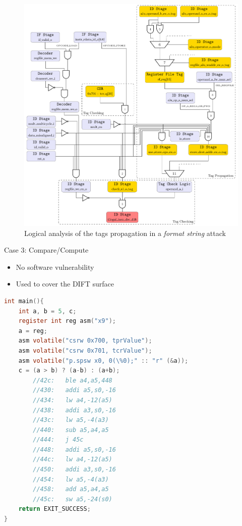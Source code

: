 \begin{frame}[noframenumbering]{}
    \begin{figure}
        \centering
        \includegraphics[height=.85\textheight]{src/2_vuln_assessment/img/wuftpd/arborescence_wuftpd.pdf}
        \caption{Logical analysis of the tags propagation in a \textit{format string} attack}
        \label{fig:analyseLogiqueFormatString}
    \end{figure}
\end{frame}
\begin{frame}{Case 3: Compare/Compute}
    \begin{itemize}
        \justifying
        \item No software vulnerability
        \item Used to cover the DIFT surface
    \end{itemize}

    \centering
    \begin{minipage}[c]{\textwidth}
        \begin{lstlisting}[language=C,label=code:compareCompute]
int main(){
    int a, b = 5, c;
    register int reg asm("x9");
    a = reg;
    asm volatile("csrw 0x700, tprValue");
    asm volatile("csrw 0x701, tcrValue");
    asm volatile("p.spsw x0, 0(\%0);" :: "r" (&a));
    c = (a > b) ? (a-b) : (a+b);
        //42c:   ble a4,a5,448
        //430:   addi a5,s0,-16
        //434:   lw a4,-12(a5)
        //438:   addi a3,s0,-16
        //43c:   lw a5,-4(a3)
        //440:   sub a5,a4,a5
        //444:   j 45c
        //448:   addi a5,s0,-16
        //44c:   lw a4,-12(a5)
        //450:   addi a3,s0,-16
        //454:   lw a5,-4(a3)
        //458:   add a5,a4,a5
        //45c:   sw a5,-24(s0)
    return EXIT_SUCCESS;
}\end{lstlisting}
    \end{minipage}
\end{frame}

